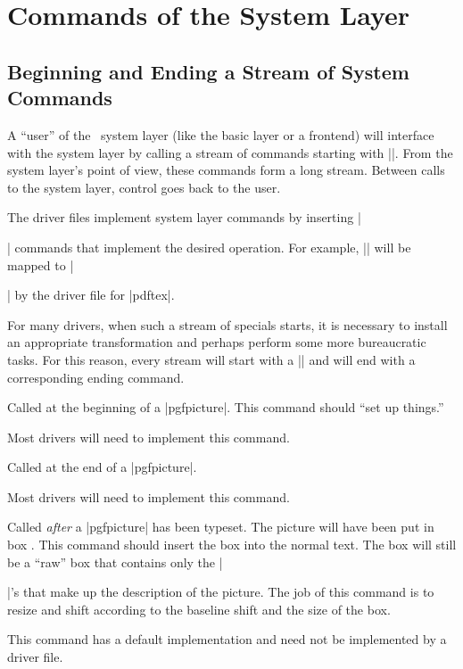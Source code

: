 %
%
%


\section{Commands of the System Layer}

\makeatletter


\subsection{Beginning and Ending a Stream of System Commands}

A ``user'' of the \pgfname\ system layer (like the basic layer or a
frontend) will interface with the system layer by calling a stream of
commands starting with |\pgfsys@|. From the system layer's point of
view, these commands form a long stream. Between calls to the system
layer, control goes back to the user.

The driver files implement system layer commands by inserting
|\special| commands that implement the desired operation. For example,
|\pgfsys@stroke| will be mapped to || by the driver
file for |pdftex|.

For many drivers, when such a stream of specials starts, it is
necessary to install an appropriate transformation and perhaps perform
some more bureaucratic tasks. For this reason, every stream will start
with a |\pgfsys@beginpicture| and will end with a corresponding ending
command.

\begin{command}{\pgfsys@beginpicture}
  Called at the beginning of a |{pgfpicture}|. This command should
  ``set up things.''

  Most drivers will need to implement this command.
\end{command}

\begin{command}{\pgfsys@endpicture}
  Called at the end of a |{pgfpicture}|.

  Most drivers will need to implement this command.
\end{command}

\begin{command}{\pgfsys@typesetpicturebox{}}
  Called \emph{after} a |{pgfpicture}| has been typeset. The picture
  will have been put in box . This command should insert the
  box into the normal text. The box  will still be a ``raw''
  box that contains only the |\special|'s that make up the description
  of the picture. The  job of this command is to resize and shift
   according to the  baseline shift and the size of the
  box.

  This command has a default implementation and need not be
  implemented by a driver file.
\end{command}


